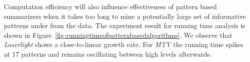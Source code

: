 Computation efficiency will also influence effectiveness of pattern based summarizers when it takes too long to mine a potentially large set of informative patterns under from the data.
The experiment result for running time analysis is shown in Figure~\ref{fig:runningtimeofpatternbasedalgorithms}.
We observe that \textit{Laserlight} shows a close-to-linear growth rate.
For \textit{MTV} the running time spikes at $17$ patterns and remains oscillating between high levels afterwards.
